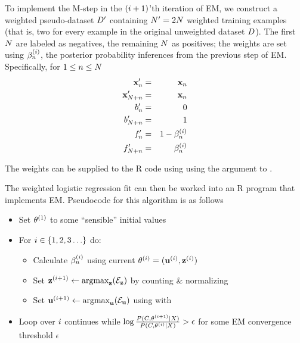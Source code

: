 \documentclass{article}
\begin{document}
To implement the M-step in the $(i+1)$'th iteration of EM,
we construct a weighted pseudo-dataset $D'$ containing $N' = 2N$ weighted training examples
(that is, two for every example in the original unweighted dataset $D$).
The first $N$ are labeled as negatives, the remaining $N$ as positives;
the weights are set using $\beta^{(i )}_{n}$, the posterior probability inferences from the previous step of EM.
Specifically, for $1 \leq n \leq N$
\begin{eqnarray*}
  {\bf x}'_{n} & = & {\bf x}_{n} \\
  {\bf x}'_{N+n} & = & {\bf x}_{n} \\
  b'_{n} & = & 0 \\
  b'_{N+n} & = & 1 \\
  f'_{n} & = & 1 - \beta^{(i )}_{n} \\
  f'_{N+n} & = & \beta^{(i )}_{n}
\end{eqnarray*}

The weights can be supplied to the R code using using the  argument to .

The weighted logistic regression fit can then be worked into an R program that implements EM.
Pseudocode for this algorithm is as follows
\begin{itemize}
\item Set $\theta^{(1)}$ to some ``sensible'' initial values
\item For $i \in \{ 1, 2, 3 \ldots \}$ do:
\begin{itemize}
\item Calculate $\beta^{(i )}_{n}$ using current $\theta^{(i)} = ({\bf u}^{(i)},{\bf z}^{(i)})$
\item Set ${\bf z}^{(i+1)} \leftarrow \mbox{argmax}_{{\bf z}} ( {\cal E}_{{\bf z}} )$ by counting \& normalizing
\item Set ${\bf u}^{(i+1)} \leftarrow \mbox{argmax}_{{\bf u}} ( {\cal E}_{{\bf u}} )$ using  with 
\end{itemize}
\item Loop over $i$ continues while $\log \frac{P(C,\theta^{(i+1)}|X)}{P(C,\theta^{(i)}|X)} > \epsilon$
  for some EM convergence threshold $\epsilon$
\end{itemize}



\end{document}
